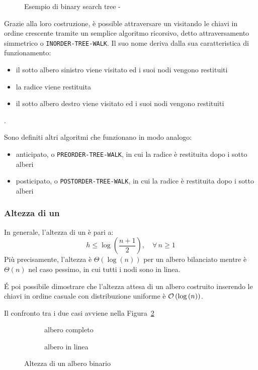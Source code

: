 \documentclass[italian, 10pt]{article}
\begin{document}
\begin{figure}[htbp]
  \bigskip
  \centering
  \caption{Esempio di binary search tree - \BST}
  \label{fig:esempio-bst}
  \bigskip
\end{figure}

\bigskip
Grazie alla loro costruzione, è possible attraversare un \BST visitando le chiavi in ordine crescente tramite un semplice algoritmo ricorsivo, detto attraversamento simmetrico o \texttt{INORDER-TREE-WALK}.
Il suo nome deriva dalla sua caratteristica di funzionamento:

\begin{itemize}
  \item il sotto albero sinistro viene visitato ed i suoi nodi vengono restituiti
  \item la radice viene restituita
  \item il sotto albero destro viene visitato ed i suoi nodi vengono restituiti
\end{itemize}.

Sono definiti altri algoritmi che funzionano in modo analogo:

\begin{itemize}
  \item anticipato, o \texttt{PREORDER-TREE-WALK}, in cui la radice è restituita dopo i sotto alberi
  \item posticipato, o \texttt{POSTORDER-TREE-WALK}, in cui la radice è restituita dopo i sotto alberi
\end{itemize}

\subsubsection{Altezza di un \BST}

In generale, l'altezza di un \BST è pari a:
\[ h \leq \log{\left(\dfrac{n+1}{2}\right)}, \quad \forall \, n \geq 1\]
Più precisamente, l'altezza è \(\Theta(\log{(n)})\) per un albero bilanciato mentre è \(\Theta(n)\) nel caso pessimo, in cui tutti i nodi sono in linea.

\bigskip
É poi possibile dimostrare che l'altezza attesa di un albero costruito inserendo le chiavi in ordine casuale con distribuzione uniforme è \(\mathcal{O}\left(\log{(n)}\right)\).

\bigskip
Il confronto tra i due casi avviene nella Figura~\ref{fig:altezza-albero-binario}

\begin{figure}[htbp]
  \bigskip
  \centering
  \begin{subfigure}[b]{0.495\textwidth}
    \centering
    \caption{albero completo}
  \end{subfigure}
  \begin{subfigure}[b]{0.495\textwidth}
    \centering
    \caption{albero in linea}
  \end{subfigure}
  \caption{Altezza di un albero binario}
  \label{fig:altezza-albero-binario}
  \bigskip
\end{figure}
\end{document}
